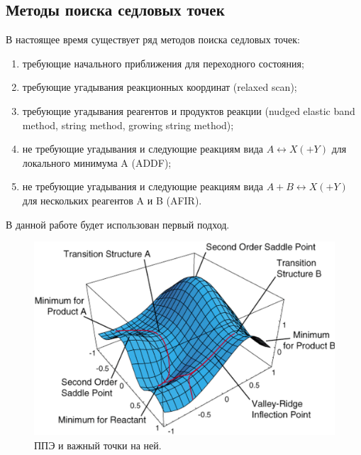 \subsection{Методы поиска седловых точек}
В настоящее время существует ряд методов поиска седловых точек:
\begin{enumerate}
    \item требующие начального приближения для переходного состояния;
    \item требующие угадывания реакционных координат (relaxed scan);
    \item требующие угадывания реагентов и продуктов реакции (nudged elastic band method, string method, growing string method);
    \item не требующие угадывания и следующие реакциям вида $A \leftrightarrow X(+Y)$ для локального минимума A (ADDF);
    \item не требующие угадывания и следующие реакциям вида $A + B \leftrightarrow X(+Y)$ для нескольких реагентов A и B (AFIR).
\end{enumerate}

В данной работе будет использован первый подход.

\begin{figure}[H]
\centering
\captionsetup{justification=centering}
\includegraphics[scale=0.8]{fig/2.png}
\caption{ППЭ и важный точки на ней.}
\end{figure}
    